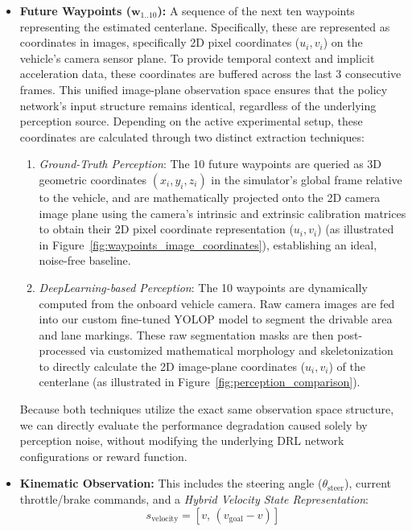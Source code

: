 \documentclass[sn-mathphys,Numbered]{sn-jnl}
\begin{document}
\begin{itemize}
    \item \textbf{Future Waypoints ($\mathbf{w}_{1..10}$):} A sequence of the next ten waypoints representing the estimated centerlane. Specifically, these are represented as coordinates in images, specifically 2D pixel coordinates ($u_i, v_i$) on the vehicle's camera sensor plane. To provide temporal context and implicit acceleration data, these coordinates are buffered across the last 3 consecutive frames. This unified image-plane observation space ensures that the policy network's input structure remains identical, regardless of the underlying perception source. Depending on the active experimental setup, these coordinates are calculated through two distinct extraction techniques:
    \begin{enumerate}
        \item \textit{Ground-Truth Perception}: The 10 future waypoints are queried as 3D geometric coordinates $(x_i, y_i, z_i)$ in the simulator's global frame relative to the vehicle, and are mathematically projected onto the 2D camera image plane using the camera's intrinsic and extrinsic calibration matrices to obtain their 2D pixel coordinate representation ($u_i, v_i$) (as illustrated in Figure~\ref{fig:waypoints_image_coordinates}), establishing an ideal, noise-free baseline.
        \item \textit{DeepLearning-based Perception}: The 10 waypoints are dynamically computed from the onboard vehicle camera. Raw camera images are fed into our custom fine-tuned YOLOP model to segment the drivable area and lane markings. These raw segmentation masks are then post-processed via customized mathematical morphology and skeletonization to directly calculate the 2D image-plane coordinates ($u_i, v_i$) of the centerlane (as illustrated in Figure~\ref{fig:perception_comparison}).
    \end{enumerate}
    Because both techniques utilize the exact same observation space structure, we can directly evaluate the performance degradation caused solely by perception noise, without modifying the underlying DRL network configurations or reward function.
    \item \textbf{Kinematic Observation:} This includes the steering angle ($\theta_{\text{steer}}$), current throttle/brake commands, and a \textit{Hybrid Velocity State Representation}:
        $$s_{\text{velocity}} = [v, \, (v_{\text{goal}} - v)]$$

\end{itemize}
\end{document}
